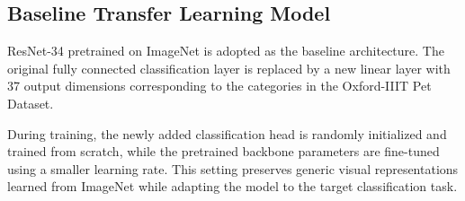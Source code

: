 \subsection{Baseline Transfer Learning Model}

ResNet-34 pretrained on ImageNet is adopted as the baseline architecture. The original fully connected classification layer is replaced by a new linear layer with 37 output dimensions corresponding to the categories in the Oxford-IIIT Pet Dataset.

During training, the newly added classification head is randomly initialized and trained from scratch, while the pretrained backbone parameters are fine-tuned using a smaller learning rate. This setting preserves generic visual representations learned from ImageNet while adapting the model to the target classification task.
